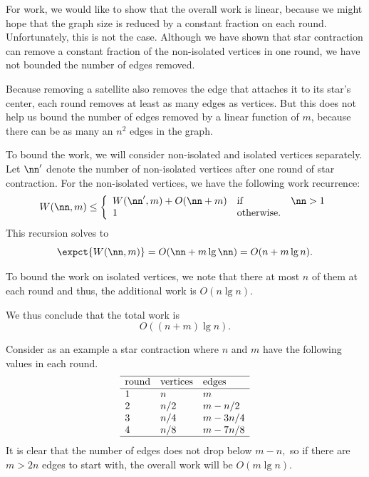 \begin{flex}
\begin{gram}
\label{graphcon::star::contraction::cost::proof::work}
For work, we would like to show that the overall work is linear,
because we might hope that the graph size is reduced by a constant
fraction on each round.
%
Unfortunately, this is not the case.  Although we have shown that star
contraction can remove a constant fraction of the non-isolated
vertices in one round, we have not bounded the number of edges
removed.
%

%
Because removing a satellite also removes the edge that attaches it to
its star's center, each round  removes at least as many edges as vertices.  
%
But this does not help us bound
the number of edges removed by a linear function of $m$, because there
can be as many an $n^2$ edges in the graph.
%

To bound the work, we will consider non-isolated and isolated vertices
separately.
%
Let $\nn'$  denote the  number of non-isolated vertices after one
round of star contraction.
%
For the non-isolated vertices, we have the following work recurrence:
\[
\begin{array}{lll}
W(\nn, m) 
\leq 
\left\{
\begin{array}{lll}
W(\nn', m) + O(\nn+m) & \mbox{if} & \nn > 1
\\
1 & \mbox{otherwise.}
\end{array}
\right.
\end{array}
\]
%
This recursion solves to
\[
\expct{W(\nn,m)} = O(\nn + m\lg \nn) = O(n + m \lg{n}).
\]

To bound the work on isolated vertices, we note that there at most $n$
of them at each round and thus, the additional work is $O(n \lg{n}).$

We thus conclude that the total work is
\[
O((n + m)\lg{n}).
\]
\end{gram}

\begin{note}
Consider as an example a star contraction where $n$ and $m$ have the
following values in each round.
\[
\begin{array}{lll}
\hline
 \mbox{round} & \mbox{vertices} & \mbox{edges}
\\
\hline
 1 & n & m 
\\
 2 & n/2 & m - n/2 
\\
 3 & n/4 & m - 3n/4 
\\
 4 & n/8 & m - 7n/8 
\\
\hline
 \end{array}
\]
It is clear that the number of edges does not drop below $m-n,$ so if
there are $m > 2n$ edges to start with, the overall work will be $O(m
\lg n)$.
%
\end{note}
\end{flex}

